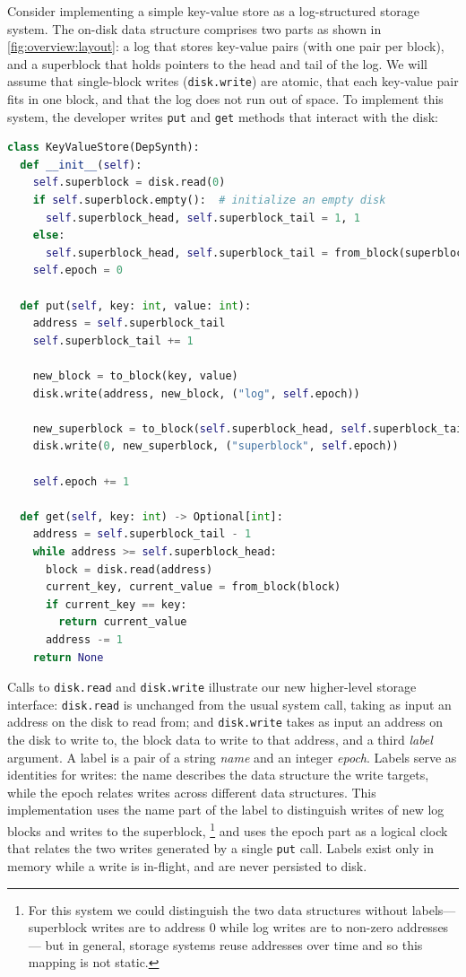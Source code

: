 Consider implementing a simple key-value store as a log-structured storage system.
The on-disk data structure comprises two parts
as shown in \cref{fig:overview:layout}:
a log that stores key-value pairs (with one pair per block),
and a superblock that holds pointers to the head and tail of the log.
We will assume that single-block writes (\texttt{disk.write}) are atomic,
that each key-value pair fits in one block, 
and that the log does not run out of space.
To implement this system,
the developer writes \texttt{put} and \texttt{get} methods that interact with the disk:
%
\begin{lstlisting}[language=py]
class KeyValueStore(DepSynth):
  def __init__(self):
    self.superblock = disk.read(0)
    if self.superblock.empty():  # initialize an empty disk
      self.superblock_head, self.superblock_tail = 1, 1
    else:
      self.superblock_head, self.superblock_tail = from_block(superblock)
    self.epoch = 0

  def put(self, key: int, value: int):
    address = self.superblock_tail
    self.superblock_tail += 1

    new_block = to_block(key, value)
    disk.write(address, new_block, ("log", self.epoch))

    new_superblock = to_block(self.superblock_head, self.superblock_tail)
    disk.write(0, new_superblock, ("superblock", self.epoch))

    self.epoch += 1

  def get(self, key: int) -> Optional[int]:
    address = self.superblock_tail - 1
    while address >= self.superblock_head:
      block = disk.read(address)
      current_key, current_value = from_block(block)
      if current_key == key:
        return current_value
      address -= 1
    return None
\end{lstlisting}
%
Calls to \texttt{disk.read} and \texttt{disk.write} illustrate our new higher-level storage interface:
\texttt{disk.read} is unchanged from the usual system call,
taking as input an address on the disk to read from; and
\texttt{disk.write} takes as input an address on the disk to write to,
the block data to write to that address,
and a third \emph{label} argument.
A label is a pair of a string \emph{name} and an integer \emph{epoch}.
Labels serve as identities for writes:
the name describes the data structure the write targets,
while the epoch relates writes across different data structures.
This implementation uses the name part of the label to distinguish writes of new log blocks and writes to the superblock,%
\footnote{For this system we could distinguish the two data structures without labels---%
superblock writes are to address 0 while log writes are to non-zero addresses---%
but in general, storage systems reuse addresses over time and so this mapping is not static.}
and uses the epoch part as a logical clock
that relates the two writes generated by a single \texttt{put} call.
Labels exist only in memory while a write is in-flight,
and are never persisted to disk.

